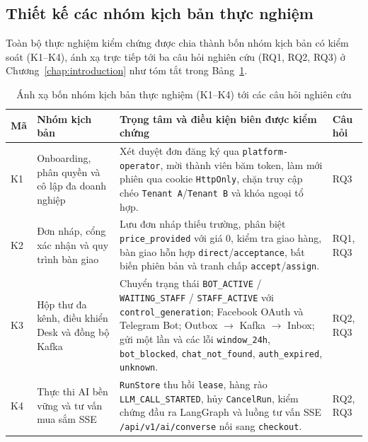 \subsection{Thiết kế các nhóm kịch bản thực nghiệm}
Toàn bộ thực nghiệm kiểm chứng được chia thành bốn nhóm kịch bản có kiểm soát (K1--K4), ánh xạ trực tiếp tới ba câu hỏi nghiên cứu (RQ1, RQ2, RQ3) ở
Chương~\ref{chap:introduction} như tóm tắt trong Bảng~\ref{tab:scenarios}.

\begin{table}[htbp]
  \centering
  \small
  \setlength{\tabcolsep}{4pt}
  \renewcommand{\arraystretch}{1.2}
  \caption{Ánh xạ bốn nhóm kịch bản thực nghiệm (K1--K4) tới các câu hỏi nghiên cứu}\label{tab:scenarios}
  \begin{tabularx}{\linewidth}{@{}
    >{\raggedright\arraybackslash}p{0.9cm}
    >{\raggedright\arraybackslash}p{3.3cm}
    >{\raggedright\arraybackslash}X
    >{\raggedright\arraybackslash}p{1.6cm}@{}}
    \toprule
    Mã & Nhóm kịch bản & Trọng tâm và điều kiện biên được kiểm chứng & Câu hỏi \\
    \midrule
    K1 & Onboarding, phân quyền và cô lập đa doanh nghiệp &
    Xét duyệt đơn đăng ký qua \texttt{platform-operator}, mời thành viên băm token, làm mới phiên qua cookie \texttt{HttpOnly}, chặn truy cập chéo \texttt{Tenant
    A}/\texttt{Tenant B} và khóa ngoại tổ hợp. &
    RQ3 \\
    K2 & Đơn nháp, cổng xác nhận và quy trình bàn giao &
    Lưu đơn nháp thiếu trường, phân biệt \texttt{price\_provided} với giá 0, kiểm tra giao hàng, bàn giao hỗn hợp \texttt{direct}/\texttt{acceptance}, bất biến phiên bản và
    tranh chấp \texttt{accept}/\texttt{assign}. &
    RQ1, RQ3 \\
    K3 & Hộp thư đa kênh, điều khiển Desk và đồng bộ Kafka &
    Chuyển trạng thái \texttt{BOT\_ACTIVE} / \texttt{WAITING\_STAFF} / \texttt{STAFF\_ACTIVE} với \texttt{control\_generation}; Facebook OAuth và Telegram Bot; Outbox
    $\rightarrow$ Kafka $\rightarrow$ Inbox; gửi một lần và các lỗi \texttt{window\_24h}, \texttt{bot\_blocked}, \texttt{chat\_not\_found}, \texttt{auth\_expired},
    \texttt{unknown}. &
    RQ2, RQ3 \\
    K4 & Thực thi AI bền vững và tư vấn mua sắm SSE &
    \texttt{RunStore} thu hồi \texttt{lease}, hàng rào \texttt{LLM\_CALL\_STARTED}, hủy \texttt{CancelRun}, kiểm chứng đầu ra LangGraph và luồng tư vấn SSE \texttt{/api/v1/ai/converse} nối sang \texttt{checkout}. &
    RQ2, RQ3 \\
    \bottomrule
  \end{tabularx}
\end{table}


